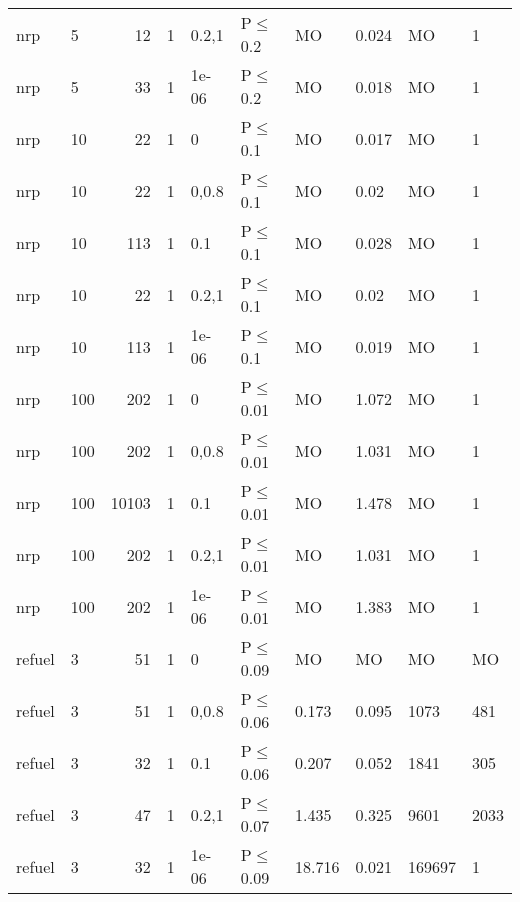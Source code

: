 \begin{longtable}{llrrllllll}
 nrp           & 5        &     	12 & 1 & 0.2,1 & P$\leq$0.2   & MO       & 0.024    & MO      & 1       \\
 nrp           & 5        &     	33 & 1 & 1e-06 & P$\leq$0.2   & MO       & 0.018    & MO      & 1       \\
 nrp           & 10       &     	22 & 1 & 0     & P$\leq$0.1   & MO       & 0.017    & MO      & 1       \\
 nrp           & 10       &     	22 & 1 & 0,0.8 & P$\leq$0.1   & MO       & 0.02     & MO      & 1       \\
 nrp           & 10       &    	113 & 1 & 0.1   & P$\leq$0.1   & MO       & 0.028    & MO      & 1       \\
 nrp           & 10       &     	22 & 1 & 0.2,1 & P$\leq$0.1   & MO       & 0.02     & MO      & 1       \\
 nrp           & 10       &    	113 & 1 & 1e-06 & P$\leq$0.1   & MO       & 0.019    & MO      & 1       \\
 nrp           & 100      &    	202 & 1 & 0     & P$\leq$0.01  & MO       & 1.072    & MO      & 1       \\
 nrp           & 100      &    	202 & 1 & 0,0.8 & P$\leq$0.01  & MO       & 1.031    & MO      & 1       \\
 nrp           & 100      &  	10103 & 1 & 0.1   & P$\leq$0.01  & MO       & 1.478    & MO      & 1       \\
 nrp           & 100      &    	202 & 1 & 0.2,1 & P$\leq$0.01  & MO       & 1.031    & MO      & 1       \\
 nrp           & 100      &    	202 & 1 & 1e-06 & P$\leq$0.01  & MO       & 1.383    & MO      & 1       \\
 refuel        & 3        &     	51 & 1 & 0     & P$\leq$0.09  & MO       & MO       & MO      & MO      \\
 refuel        & 3        &     	51 & 1 & 0,0.8 & P$\leq$0.06  & 0.173    & 0.095    & 1073    & 481     \\
 refuel        & 3        &     	32 & 1 & 0.1   & P$\leq$0.06  & 0.207    & 0.052    & 1841    & 305     \\
 refuel        & 3        &     	47 & 1 & 0.2,1 & P$\leq$0.07  & 1.435    & 0.325    & 9601    & 2033    \\
 refuel        & 3        &     	32 & 1 & 1e-06 & P$\leq$0.09  & 18.716   & 0.021    & 169697  & 1       \\
\bottomrule
\end{longtable}
